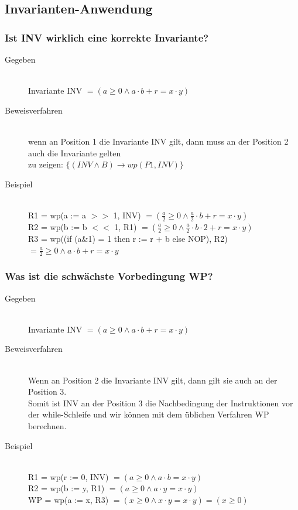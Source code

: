 \documentclass[a4paper,10pt]{article}
\newcommand{\ra}{\rightarrow}
\begin{document}
\subsection{Invarianten-Anwendung}

\subsubsection{Ist INV wirklich eine korrekte Invariante?}
\begin{description}
	\item[Gegeben] \hfill \\
		Invariante INV $= (a \geq 0 \wedge a\cdot b + r = x\cdot y)$ 
	\item[Beweisverfahren] \hfill \\
		wenn an Position 1 die Invariante INV gilt, dann muss an der Position 2 auch die Invariante gelten \\
		zu zeigen: $\{ (INV \wedge B) \ra wp(P1, INV) \}$
	\item[Beispiel] \hfill \\
		R1 = wp(a := a $>>$ 1, INV) $= (\frac{a}{2} \geq 0 \wedge \frac{a}{2}\cdot b + r = x\cdot y)$ \\
		R2 = wp(b := b $<<$ 1, R1) $= (\frac{a}{2} \geq 0 \wedge \frac{a}{2}\cdot b\cdot 2 + r = x\cdot y)$ \\
		R3 = wp((if (a\&1) = 1 then r := r + b else NOP), R2) $= \frac{a}{2} \geq 0 \wedge a\cdot b + r = x\cdot y$
\end{description}

\subsubsection{Was ist die schw\"achste Vorbedingung WP?}
\begin{description}
	\item[Gegeben] \hfill \\
		Invariante INV $= (a \geq 0 \wedge a\cdot b + r = x\cdot y)$ 
	\item[Beweisverfahren] \hfill \\
		Wenn an Position 2 die Invariante INV gilt, dann gilt sie auch an der Position 3. \\
		Somit ist INV an der Position 3 die Nachbedingung der Instruktionen vor der while-Schleife und wir k\"onnen mit dem \"ublichen Verfahren WP berechnen.
	\item[Beispiel] \hfill \\
		R1 = wp(r := 0, INV) $= (a \geq 0 \wedge a\cdot b = x\cdot y)$ \\
		R2 = wp(b := y, R1) $= (a \geq 0 \wedge a\cdot y = x\cdot y)$ \\
		WP = wp(a := x, R3) $= (x \geq 0 \wedge x\cdot y = x\cdot y) = (x \geq 0)$
\end{description}
\end{document}

